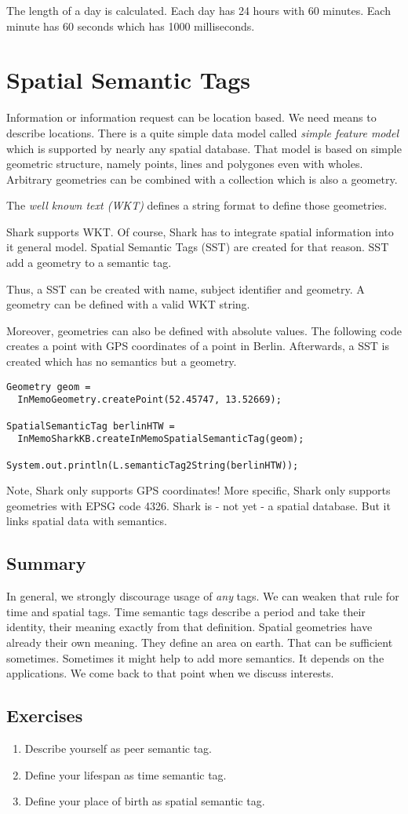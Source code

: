 The length of a day is calculated. Each day has 24 hours with 60 minutes. Each minute has 60 seconds which has 1000 milliseconds.

\section{Spatial Semantic Tags}
Information or information request can be location based. We need means to
describe locations. There is a quite simple data model called {\it simple feature model} which is supported by nearly any spatial database. That
model is based on simple geometric structure, namely points, lines and polygones even with wholes. Arbitrary geometries can be combined with a collection which is also a geometry.

The {\it well known text (WKT)} defines a string format to define those geometries.

Shark supports WKT. Of course, Shark has to integrate spatial information into it general model. Spatial Semantic Tags (SST) are created for that reason. 
SST add a geometry to a semantic tag.

Thus, a SST can be created with name, subject identifier and geometry.
A geometry can be defined with a valid WKT string.

Moreover, geometries can also be defined with absolute values.
The following code creates a point with GPS coordinates of a point in Berlin.
Afterwards, a SST is created which has no semantics but a geometry.

\begin{verbatim}
Geometry geom = 
  InMemoGeometry.createPoint(52.45747, 13.52669);

SpatialSemanticTag berlinHTW = 
  InMemoSharkKB.createInMemoSpatialSemanticTag(geom);

System.out.println(L.semanticTag2String(berlinHTW));
\end{verbatim}

Note, Shark only supports GPS coordinates! More specific, Shark only supports geometries with EPSG code 4326. Shark is - not yet - a spatial database. But it links spatial data with semantics.

\subsection{Summary}
In general, we strongly discourage usage of {\it any} tags. We can weaken that rule for time and spatial tags. Time semantic tags describe a period and 
take their identity, their meaning exactly from that definition. 
Spatial geometries have already their own meaning. They define an area on earth. That can be sufficient sometimes. Sometimes it might help to add more semantics. It depends on the applications. We come back to that point when we discuss interests.

\subsection{Exercises}
\begin{enumerate}
\item 
Describe yourself as peer semantic tag.
\item 
Define your lifespan as time semantic tag.
\item 
Define your place of birth as spatial semantic tag.
\end{enumerate}
